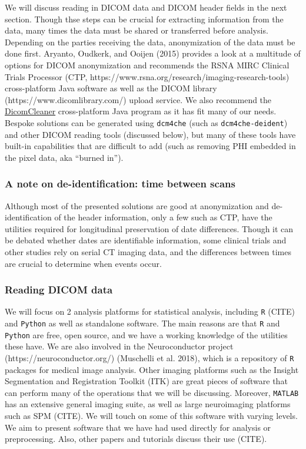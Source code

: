 \documentclass[]{elsarticle} %
\begin{document}
We will discuss reading in DICOM data and DICOM header fields in the
next section. Though thse steps can be crucial for extracting
information from the data, many times the data must be shared or
transferred before analysis. Depending on the parties receiving the
data, anonymization of the data must be done first. Aryanto, Oudkerk,
and Ooijen (2015) provides a look at a multitude of options for DICOM
anonymization and recommends the RSNA MIRC Clinical Trials Processor
(CTP, https://www.rsna.org/research/imaging-research-tools)
cross-platform Java software as well as the DICOM library
(https://www.dicomlibrary.com/) upload service. We also recommend the
\href{https://www.dclunie.com/pixelmed/software/webstart/DicomCleanerUsage.html}{DicomCleaner}
cross-platform Java program as it has fit many of our needs. Bespoke
solutions can be generated using \texttt{dcm4che} (such as
\texttt{dcm4che-deident}) and other DICOM reading tools (discussed
below), but many of these tools have built-in capabilities that are
difficult to add (such as removing PHI embedded in the pixel data, aka
``burned in'').

\hypertarget{a-note-on-de-identification-time-between-scans}{%
\subsubsection{A note on de-identification: time between
scans}\label{a-note-on-de-identification-time-between-scans}}

Although most of the presented solutions are good at anonymization and
de-identification of the header information, only a few such as CTP,
have the utilities required for longitudinal preservation of date
differences. Though it can be debated whether dates are identifiable
information, some clinical trials and other studies rely on serial CT
imaging data, and the differences between times are crucial to determine
when events occur.

\hypertarget{reading-dicom-data}{%
\subsubsection{Reading DICOM data}\label{reading-dicom-data}}

We will focus on 2 analysis platforms for statistical analysis,
including \texttt{R} (CITE) and \texttt{Python} as well as standalone
software. The main reasons are that \texttt{R} and \texttt{Python} are
free, open source, and we have a working knowledge of the utilities
these have. We are also involved in the Neuroconductor project
(https://neuroconductor.org/) (Muschelli et al. 2018), which is a
repository of \texttt{R} packages for medical image analysis. Other
imaging platforms such as the Insight Segmentation and Registration
Toolkit (ITK) are great pieces of software that can perform many of the
operations that we will be discussing. Moreover, \texttt{MATLAB} has an
extensive general imaging suite, as well as large neuroimaging platforms
such as SPM (CITE). We will touch on some of this software with varying
levels. We aim to present software that we have had used directly for
analysis or preprocessing. Also, other papers and tutorials discuss
their use (CITE).
\end{document}
